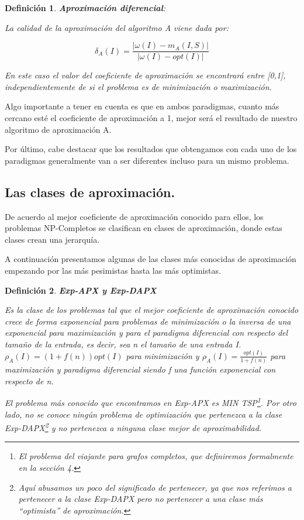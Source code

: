 \documentclass[a4paper,12pt,titlepage]{article}
\newtheorem{defi}{Definici\'on}[section]
\begin{document}
\begin{defi}

\textbf{Aproximaci\'on diferencial}:

La calidad de la aproximaci\'on del algoritmo A viene dada por:

\begin{equation}
\delta_{A}(I)=\frac{|\omega(I)-m_{A}(I,S)|}{|\omega(I)-opt(I)|}
\end{equation}

En este caso el valor del coeficiente de aproximaci\'on se encontrar\'a entre [0,1], independientemente de si el problema es de minimizaci\'on o maximizaci\'on.

\end{defi}

Algo importante a tener en cuenta es que en ambos paradigmas, cuanto m\'as cercano est\'e el coeficiente de aproximaci\'on a 1, mejor ser\'a el resultado de nuestro algoritmo de aproximaci\'on A.

Por \'ultimo, cabe destacar que los resultados que obtengamos con cada uno de los paradigmas generalmente van a ser diferentes incluso para un mismo problema.

\subsection{Las clases de aproximaci\'on.}

De acuerdo al mejor coeficiente de aproximaci\'on conocido para ellos, los problemas NP-Completos se clasifican en clases de aproximaci\'on, donde estas clases crean una jerarqu\'ia.

A continuaci\'on presentamos algunas de las clases m\'as conocidas de aproximaci\'on empezando por las m\'as pesimistas hasta las m\'as optimistas.

\begin{defi}

\textbf{Exp-APX y Exp-DAPX}

Es la clase de los problemas tal que el mejor coeficiente de aproximaci\'on conocido crece de forma exponencial para problemas de minimizaci\'on o la inversa de una exponencial para maximizaci\'on y para el paradigma diferencial con respecto del tamaño de la entrada, es decir, sea n el tamaño de una entrada I.
$\rho_{A}(I)=(1+f(n))opt(I)$ para minimizaci\'on y $\rho_{A}(I)=\frac{opt(I)}{1+f(n)}$ para maximizaci\'on y paradigma diferencial siendo f una funci\'on exponencial con respecto de n.

El problema m\'as conocido que encontramos en Exp-APX es MIN TSP\footnote{El problema del viajante para grafos completos, que definiremos formalmente en la secci\'on 4.}. Por otro lado, no se conoce ning\'un problema de optimizaci\'on que pertenezca a la clase Exp-DAPX\footnote{Aqu\'i abusamos un poco del significado de pertenecer, ya que nos referimos a pertenecer a la clase Exp-DAPX pero no pertenecer a una clase m\'as ``optimista'' de aproximaci\'on.} y no pertenezca a ninguna clase mejor de aproximabilidad.

\end{defi}
\end{document}
